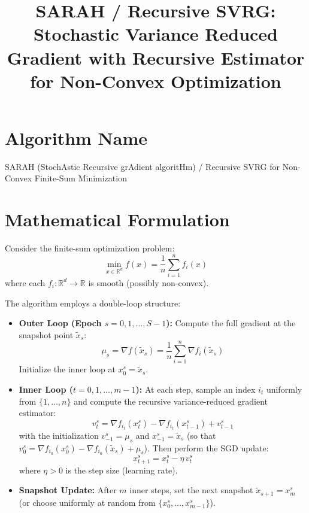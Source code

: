 \documentclass{article}
\title{SARAH / Recursive SVRG: Stochastic Variance Reduced Gradient with Recursive Estimator for Non-Convex Optimization}
\author{}
\date{}
\newcommand{\R}{\mathbb{R}}
\newcommand{\grad}{\nabla}
\begin{document}
\maketitle

\section*{Algorithm Name}
SARAH (StochAstic Recursive grAdient algoritHm) / Recursive SVRG for Non-Convex Finite-Sum Minimization

\section*{Mathematical Formulation}

Consider the finite-sum optimization problem:
\begin{equation}
    \min_{x \in \R^d} f(x) = \frac{1}{n} \sum_{i=1}^n f_i(x)
\end{equation}
where each $f_i: \R^d \to \R$ is smooth (possibly non-convex).

The algorithm employs a double-loop structure:
\begin{itemize}
    \item \textbf{Outer Loop (Epoch $s = 0, 1, \dots, S-1$):} Compute the full gradient at the snapshot point $\tilde{x}_s$:
    \begin{equation}
        \mu_s = \grad f(\tilde{x}_s) = \frac{1}{n} \sum_{i=1}^n \grad f_i(\tilde{x}_s)
    \end{equation}
    Initialize the inner loop at $x_0^s = \tilde{x}_s$.
    \item \textbf{Inner Loop ($t = 0, 1, \dots, m-1$):} At each step, sample an index $i_t$ uniformly from $\{1,\dots,n\}$ and compute the recursive variance-reduced gradient estimator:
    \begin{equation}
        v_t^s = \grad f_{i_t}(x_t^s) - \grad f_{i_t}(x_{t-1}^s) + v_{t-1}^s
    \end{equation}
    with the initialization $v_{-1}^s = \mu_s$ and $x_{-1}^s = \tilde{x}_s$ (so that $v_0^s = \grad f_{i_0}(x_0^s) - \grad f_{i_0}(\tilde{x}_s) + \mu_s$).
    Then perform the SGD update:
    \begin{equation}
        x_{t+1}^s = x_t^s - \eta \, v_t^s
    \end{equation}
    where $\eta > 0$ is the step size (learning rate).
    \item \textbf{Snapshot Update:} After $m$ inner steps, set the next snapshot $\tilde{x}_{s+1} = x_m^s$ (or choose uniformly at random from $\{x_0^s, \dots, x_{m-1}^s\}$).
\end{itemize}
\end{document}
